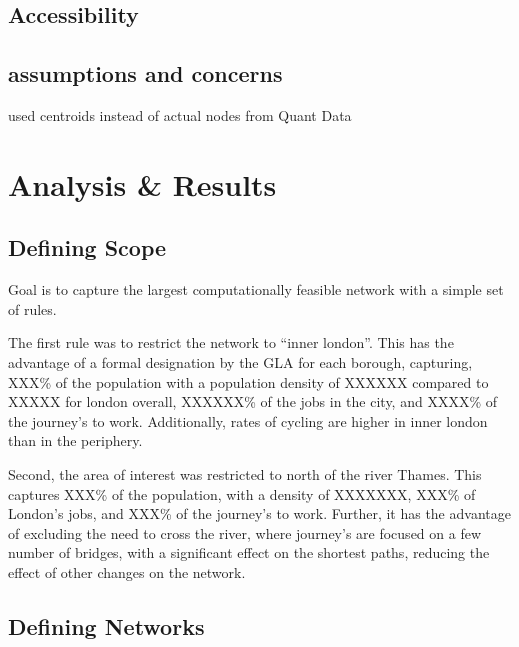 \documentclass[11pt]{article} %
\begin{document}
\subsection{Accessibility}

\subsection{assumptions and concerns}

used centroids instead of actual nodes from Quant Data


\section{Analysis \& Results}

\subsection{Defining Scope}

Goal is to capture the largest computationally feasible network with a simple set of rules. 

The first rule was to restrict the network to ``inner london''. This has the advantage of a formal designation by the GLA for each borough, capturing, XXX\% of the population with a population density of XXXXXX compared to XXXXX for london overall, XXXXXX\% of the jobs in the city, and XXXX\% of the journey's to work. Additionally, rates of cycling are higher in inner london than in the periphery. 

Second, the area of interest was restricted to north of the river Thames. This captures XXX\% of the population, with a density of XXXXXXX, XXX\% of London's jobs, and XXX\% of the journey's to work. Further, it has the advantage of excluding the need to cross the river, where journey's are focused on a few number of bridges, with a significant effect on the shortest paths, reducing the effect of other changes on the network. 




 

\subsection{Defining Networks}
\end{document}
